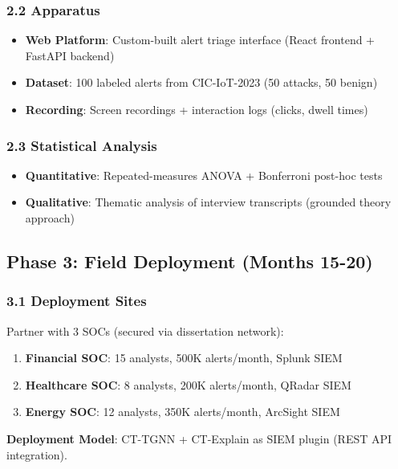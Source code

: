 \documentclass[11pt]{article}
\begin{document}
\subsubsection{2.2 Apparatus}

\begin{itemize}
    \item \textbf{Web Platform}: Custom-built alert triage interface (React frontend + FastAPI backend)
    \item \textbf{Dataset}: 100 labeled alerts from CIC-IoT-2023 (50 attacks, 50 benign)
    \item \textbf{Recording}: Screen recordings + interaction logs (clicks, dwell times)
\end{itemize}

\subsubsection{2.3 Statistical Analysis}

\begin{itemize}
    \item \textbf{Quantitative}: Repeated-measures ANOVA + Bonferroni post-hoc tests
    \item \textbf{Qualitative}: Thematic analysis of interview transcripts (grounded theory approach)
\end{itemize}

\subsection{Phase 3: Field Deployment (Months 15-20)}

\subsubsection{3.1 Deployment Sites}

Partner with 3 SOCs (secured via dissertation network):

\begin{enumerate}
    \item \textbf{Financial SOC}: 15 analysts, 500K alerts/month, Splunk SIEM
    \item \textbf{Healthcare SOC}: 8 analysts, 200K alerts/month, QRadar SIEM
    \item \textbf{Energy SOC}: 12 analysts, 350K alerts/month, ArcSight SIEM
\end{enumerate}

\textbf{Deployment Model}: CT-TGNN + CT-Explain as SIEM plugin (REST API integration).
\end{document}
